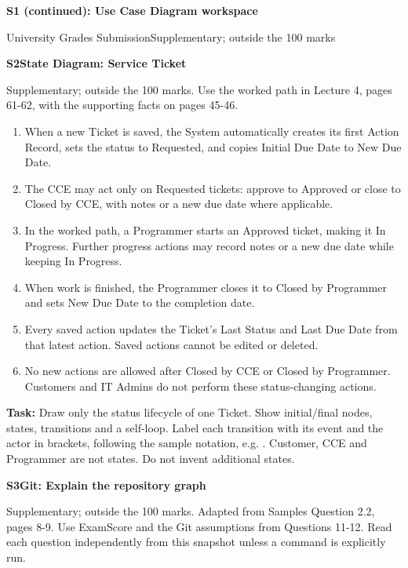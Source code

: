 \blankbox{3.5cm}
\newpage
\textbf{\Large S1 (continued): Use Case Diagram workspace}\par
University Grades Submission\hfill Supplementary; outside the 100 marks\par
\blankbox{21.5cm}
\newpage
\textbf{\Large S2\quad State Diagram: Service Ticket}\par
Supplementary; outside the 100 marks. Use the worked path in Lecture 4, pages 61-62, with the supporting facts on pages 45-46.\par
\begin{enumerate}[itemsep=2pt]
\item When a new Ticket is saved, the System automatically creates its first Action Record, sets the status to Requested, and copies Initial Due Date to New Due Date.
\item The CCE may act only on Requested tickets: approve to Approved or close to Closed by CCE, with notes or a new due date where applicable.
\item In the worked path, a Programmer starts an Approved ticket, making it In Progress. Further progress actions may record notes or a new due date while keeping In Progress.
\item When work is finished, the Programmer closes it to Closed by Programmer and sets New Due Date to the completion date.
\item Every saved action updates the Ticket's Last Status and Last Due Date from that latest action. Saved actions cannot be edited or deleted.
\item No new actions are allowed after Closed by CCE or Closed by Programmer. Customers and IT Admins do not perform these status-changing actions.
\end{enumerate}
\textbf{Task:} Draw only the status lifecycle of one Ticket. Show initial/final nodes, states, transitions and a self-loop. Label each transition with its event and the actor in brackets, following the sample notation, e.g. . Customer, CCE and Programmer are not states. Do not invent additional states.\par
\blankbox{13cm}
\newpage
\textbf{\Large S3\quad Git: Explain the repository graph}\par
Supplementary; outside the 100 marks. Adapted from Samples Question 2.2, pages 8-9. Use ExamScore and the Git assumptions from Questions 11-12. Read each question independently from this snapshot unless a command is explicitly run.\par
\begin{center}\supplementgitgraph\end{center}
